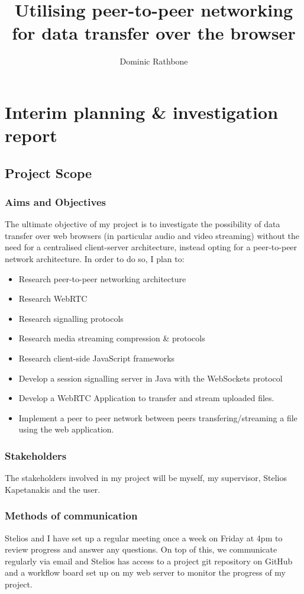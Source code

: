 \documentclass[]{report}
\title{Utilising peer-to-peer networking for data transfer over the browser}
\author{Dominic Rathbone}
\begin{document}
\maketitle
\tableofcontents
\listoftodos

\chapter{Interim planning \& investigation report}
	\section{Project Scope}
		\subsection*{Aims and Objectives}
			The ultimate objective of my project is to investigate the possibility of data transfer over web browsers (in particular audio and video streaming) without the need for a centralised client-server architecture, instead opting for a peer-to-peer network architecture. In order to do so, I plan to:
			\begin{itemize}
				\item Research peer-to-peer networking architecture
				\item Research WebRTC
				\item Research signalling protocols
				\item Research media streaming compression \& protocols
				\item Research client-side JavaScript frameworks
				\item Develop a session signalling server in Java with the WebSockets protocol
				\item Develop a WebRTC Application to transfer and stream uploaded files.
				\item Implement a peer to peer network between peers transfering/streaming a file using the web application.
			\end{itemize}
		\subsection*{Stakeholders}
			The stakeholders involved in my project will be myself, my supervisor, Stelios Kapetanakis and the user.
		\subsection*{Methods of communication}
			Stelios and I have set up a regular meeting once a week on Friday at 4pm to review progress and answer any questions. On top of this, we communicate regularly via email and Stelios has access to a project git repository on GitHub and a workflow board set up on my web server to monitor the progress of my project. 
			
\end{document}
